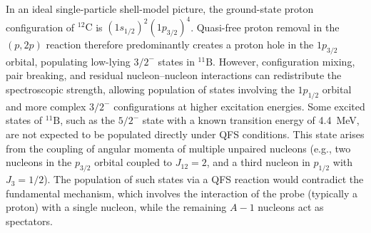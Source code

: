 In an ideal single-particle shell-model picture, the ground-state proton configuration of $^{12}\mathrm{C}$ is $(1s_{1/2})^{2}(1p_{3/2})^{4}$. Quasi-free proton removal in the $(p,2p)$ reaction therefore predominantly creates a proton hole in the $1p_{3/2}$ orbital, populating low-lying $3/2^{-}$ states in $^{11}\mathrm{B}$. However, configuration mixing, pair breaking, and residual nucleon--nucleon interactions can redistribute the spectroscopic strength, allowing population of states involving the $1p_{1/2}$ orbital and more complex $3/2^{-}$ configurations at higher excitation energies.
Some excited states of $^{11}\mathrm{B}$, such as the $5/2^-$ state with a known transition energy of 4.4~MeV, are not expected to be populated directly under QFS conditions. This state arises from the coupling of angular momenta of multiple unpaired nucleons (e.g., two nucleons in the $p_{3/2}$ orbital coupled to $J_{12} = 2$, and a third nucleon in $p_{1/2}$ with $J_3 = 1/2$). The population of such states via a QFS reaction would contradict the fundamental mechanism, which involves the interaction of the probe (typically a proton) with a single nucleon, while the remaining $A-1$ nucleons act as spectators.

